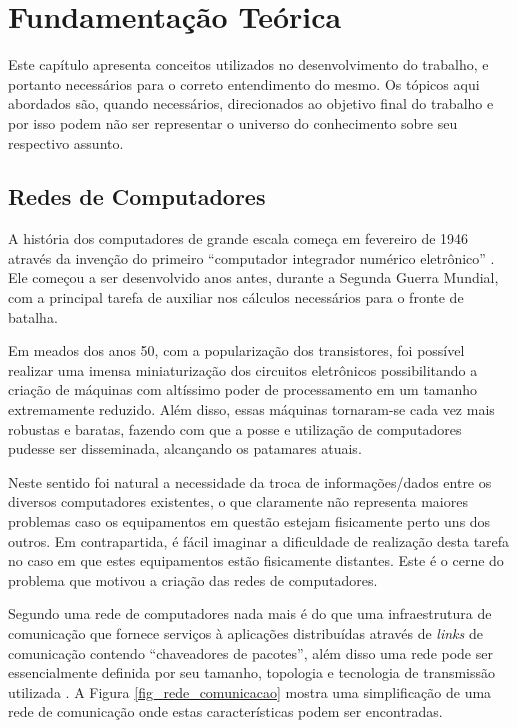 \chapter{Fundamentação Teórica}
Este capítulo apresenta conceitos utilizados no desenvolvimento do trabalho, e portanto necessários para o correto entendimento do mesmo. Os tópicos aqui abordados são, quando necessários, direcionados ao objetivo final do trabalho e por isso podem não ser representar o universo do conhecimento sobre seu respectivo assunto.

\section{Redes de Computadores}
A história dos computadores de grande escala começa em fevereiro de 1946 através da invenção do primeiro ``computador integrador numérico eletrônico''  \cite{Book-Jean2013}. Ele começou a ser desenvolvido anos antes, durante a Segunda Guerra Mundial, com a principal tarefa de auxiliar nos cálculos necessários para o fronte de batalha.

Em meados dos anos 50, com a popularização dos transistores, foi possível realizar uma imensa miniaturização dos circuitos eletrônicos possibilitando a criação de máquinas com altíssimo poder de processamento em um tamanho extremamente reduzido. Além disso, essas máquinas tornaram-se cada vez mais robustas e baratas, fazendo com que a posse e utilização de computadores pudesse ser disseminada, alcançando os patamares atuais.

Neste sentido foi natural a necessidade da troca de informações/dados entre os diversos computadores existentes, o que claramente não representa maiores problemas caso os equipamentos em questão estejam fisicamente perto uns dos outros. Em contrapartida, é fácil imaginar a dificuldade de realização desta tarefa no caso em que estes equipamentos estão fisicamente distantes. Este é o cerne do problema que motivou a criação das redes de computadores.

Segundo \cite{Book-Kurose2013} uma rede de computadores nada mais é do que uma infraestrutura de comunicação que fornece serviços à aplicações distribuídas através de \emph{links} de comunicação contendo ``chaveadores de pacotes'', além disso uma rede pode ser essencialmente definida por seu tamanho, topologia e tecnologia de transmissão utilizada \cite{Book-Tanenbaum2003}. A Figura \ref{fig_rede_comunicacao} mostra uma simplificação de uma rede de comunicação onde estas características podem ser encontradas.

